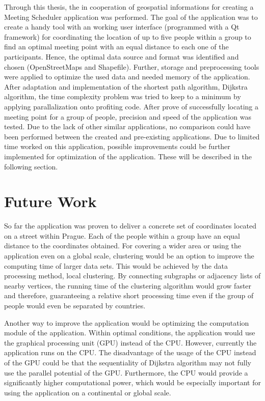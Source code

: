 \documentclass[thesis=M,english]{FITthesis}[2012/10/20]
\begin{document}
Through this thesis, the in cooperation of geospatial informations for creating a Meeting Scheduler application was performed. The goal of the application was to create a handy tool with an working user interface (programmed with a Qt framework) for coordinating the location of up to five people within a group to find an optimal meeting point with an equal distance to each one of the participants. Hence, the optimal data source and format was identified and chosen (OpenStreetMaps and Shapefile). Further, storage and preprocessing tools were applied to optimize the used data and needed memory of the application. After adaptation and implementation of the shortest path algorithm, Dijkstra algorithm, the time complexity problem was tried to keep to a minimum by applying parallalization onto profiting code. After prove of successfully locating a meeting point for a group of people, precision and speed of the application was tested. Due to the lack of other similar applications, no comparison could have been performed between the created and pre-existing applications. Due to limited time worked on this application, possible improvements could be further implemented for optimization of the application. These will be described in the following section.

\section{Future Work}


So far the application was proven to deliver a concrete set of coordinates located on a street within Prague. Each of the people within a group have an equal distance to the coordinates obtained. 
For covering a wider area or using the application even on a global scale, clustering would be an option to improve the computing time of larger data sets. This would be achieved by the data processing method, local clustering. By connecting subgraphs or adjacency lists of nearby vertices, the running time of the clustering algorithm would grow faster and therefore, guaranteeing a relative short processing time even if the group of people would even be separated by countries.


Another way to improve the application would be optimizing the computation module of the application. Within optimal conditions, the application would use the graphical processing unit (GPU) instead of the CPU. However, currently the application runs on the CPU. The disadvantage of the usage of the CPU instead of the GPU could be that the sequentiality of Dijkstra algorithm may not fully use the parallel potential of the GPU. Furthermore, the CPU would provide a significantly higher computational power, which would be especially important for using the application on a continental or global scale.
\end{document}
